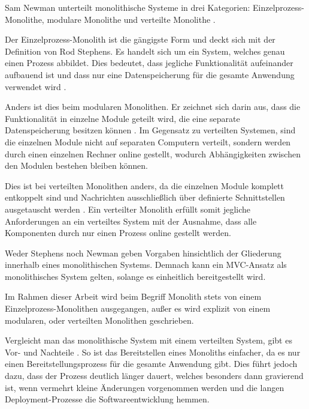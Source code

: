 Sam Newman unterteilt monolithische Systeme in drei Kategorien: Einzelprozess-Monolithe, modulare Monolithe und verteilte Monolithe \parencite[vgl.][Kap. 2.2]{newman_monolith_2019}.

Der Einzelprozess-Monolith ist die gängigste Form und deckt sich mit der Definition von Rod Stephens. Es handelt sich um ein System, welches genau einen Prozess abbildet. Dies bedeutet, dass jegliche Funktionalität aufeinander aufbauend ist und dass nur eine Datenspeicherung für die gesamte Anwendung verwendet wird \parencite[vgl.][Kap. 2.2.1]{newman_monolith_2019}.

Anders ist dies beim modularen Monolithen. Er zeichnet sich darin aus, dass die Funktionalität in einzelne Module geteilt wird, die eine separate Datenspeicherung besitzen können \parencite[vgl.][Kap. 2.2.2]{newman_monolith_2019}. Im Gegensatz zu verteilten Systemen, sind die einzelnen Module nicht auf separaten Computern verteilt, sondern werden durch einen einzelnen Rechner online gestellt, wodurch Abhängigkeiten zwischen den Modulen bestehen bleiben können.

Dies ist bei verteilten Monolithen anders, da die einzelnen Module komplett entkoppelt sind und Nachrichten ausschließlich über definierte Schnittstellen ausgetauscht werden \parencite[vgl.][S. 116]{starke_effektive_2015}. Ein verteilter Monolith erfüllt somit jegliche Anforderungen an ein verteiltes System mit der Ausnahme, dass alle Komponenten durch nur einen Prozess online gestellt werden.

Weder Stephens noch Newman geben Vorgaben hinsichtlich der Gliederung innerhalb eines monolithischen Systems. Demnach kann ein MVC-Ansatz als monolithisches System gelten, solange es einheitlich bereitgestellt wird.

Im Rahmen dieser Arbeit wird beim Begriff Monolith stets von einem Einzelprozess-Monolithen ausgegangen, außer es wird explizit von einem modularen, oder verteilten Monolithen geschrieben.

Vergleicht man das monolithische System mit einem verteilten System, gibt es Vor- und Nachteile \parencite[vgl.][Kap. 2.2.4 und Kap. 2.2.5]{newman_monolith_2019}. So ist das Bereitstellen eines Monoliths einfacher, da es nur einen Bereitstellungsprozess für die gesamte Anwendung gibt. Dies führt jedoch dazu, dass der Prozess deutlich länger dauert, welches besonders dann gravierend ist, wenn vermehrt kleine Änderungen vorgenommen werden und die langen Deployment-Prozesse die Softwareentwicklung hemmen. 

